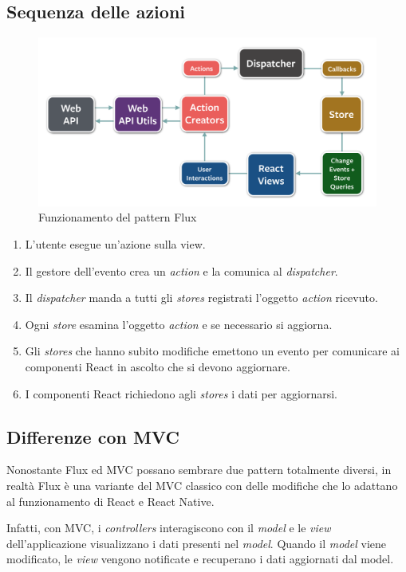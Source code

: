 \subsection{Sequenza delle azioni}

\begin{figure}[htp]
\centering
\includegraphics[width=\textwidth*3/4]{../immagini/flux-diagram}
\caption{Funzionamento del pattern Flux}  
\end{figure}
\FloatBarrier

\begin{enumerate}
\item L'utente esegue un'azione sulla view.
\item Il gestore dell'evento crea un \textit{action} e la comunica al \textit{dispatcher}.
\item Il \textit{dispatcher} manda a tutti gli \textit{stores} registrati l'oggetto \textit{action} ricevuto.
\item Ogni \textit{store} esamina l'oggetto  \textit{action} e se necessario si aggiorna. 
\item Gli \textit{stores} che hanno subito modifiche emettono un evento per comunicare ai componenti React in ascolto che si devono aggiornare.
\item I componenti React richiedono agli \textit{stores} i dati per aggiornarsi.
\end{enumerate}

\subsection{Differenze con MVC}

Nonostante Flux ed MVC possano sembrare due pattern totalmente diversi, in realtà Flux è una variante del MVC classico con delle modifiche che lo adattano al funzionamento di React e React Native.

Infatti, con MVC, i \textit{controllers} interagiscono con il \textit{model} e le \textit{view} dell'applicazione visualizzano i dati presenti nel \textit{model}.
Quando il \textit{model} viene modificato, le \textit{view} vengono notificate e recuperano i dati aggiornati dal model.


